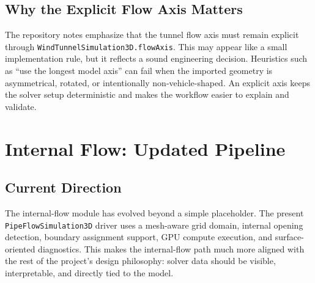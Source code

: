 \documentclass[12pt,a4paper,titlepage]{report}
\begin{document}
\section{Why the Explicit Flow Axis Matters}
The repository notes emphasize that the tunnel flow axis must remain explicit through \texttt{WindTunnelSimulation3D.flowAxis}. This may appear like a small implementation rule, but it reflects a sound engineering decision. Heuristics such as ``use the longest model axis'' can fail when the imported geometry is asymmetrical, rotated, or intentionally non-vehicle-shaped. An explicit axis keeps the solver setup deterministic and makes the workflow easier to explain and validate.

\chapter{Internal Flow: Updated Pipeline}
\section{Current Direction}
The internal-flow module has evolved beyond a simple placeholder. The present \texttt{PipeFlowSimulation3D} driver uses a mesh-aware grid domain, internal opening detection, boundary assignment support, GPU compute execution, and surface-oriented diagnostics. This makes the internal-flow path much more aligned with the rest of the project's design philosophy: solver data should be visible, interpretable, and directly tied to the model.
\end{document}
